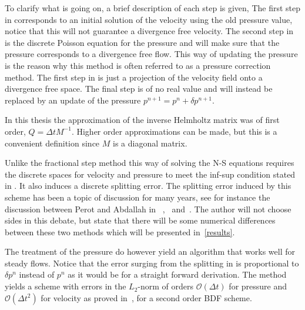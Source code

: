 To clarify what is going on, a brief description of each step is given,
The first step in  corresponds to an initial solution of the velocity using 
the old pressure value, notice that this will not guarantee a divergence free velocity.
The second step in  is the discrete Poisson equation for the pressure and will 
make sure that the pressure corresponds to a divergence free flow. 
This way of updating the pressure is the reason why this method is often referred to as a pressure 
correction method.
The first step in  is just a projection of the velocity field
onto a divergence free space. The final step is of no real value and will instead be replaced 
by an update of the pressure $p^{n+1} = p^{n}+\delta p^{n+1}$.

In this thesis the approximation of the inverse Helmholtz matrix was of first order, 
$Q = \Delta t M^{-1}$. Higher order approximations can be made, but this is 
a convenient definition since $M$ is a diagonal matrix.

Unlike the fractional step method this way of solving the N-S equations  
requires the discrete spaces for velocity and pressure
to meet the inf-sup condition stated in . 
It also induces a discrete splitting error. The splitting error induced by this scheme 
has been a topic of discussion for many years, see for instance the discussion between Perot and Abdallah in
~\cite{Perot},~\cite{Abdallah} and~\cite{Perotcomments}. The author will not choose sides in this debate, 
but state that there will be some numerical differences between these two methods which will be presented 
in~\cref{results}.

The treatment of the pressure do however yield an algorithm that works well for steady flows.
Notice that the error surging from the splitting in 
is proportional to $\delta p^n$ instead of $p^n$ as it would be for a straight forward derivation. 
The method yields a scheme with errors in the $L_2$-norm of orders $\mathcal{O}(\Delta t)$ for pressure 
and $\mathcal{O}(\Delta t ^2)$ for velocity as proved in~\cite{Guermond2006},
for a second order BDF scheme.
